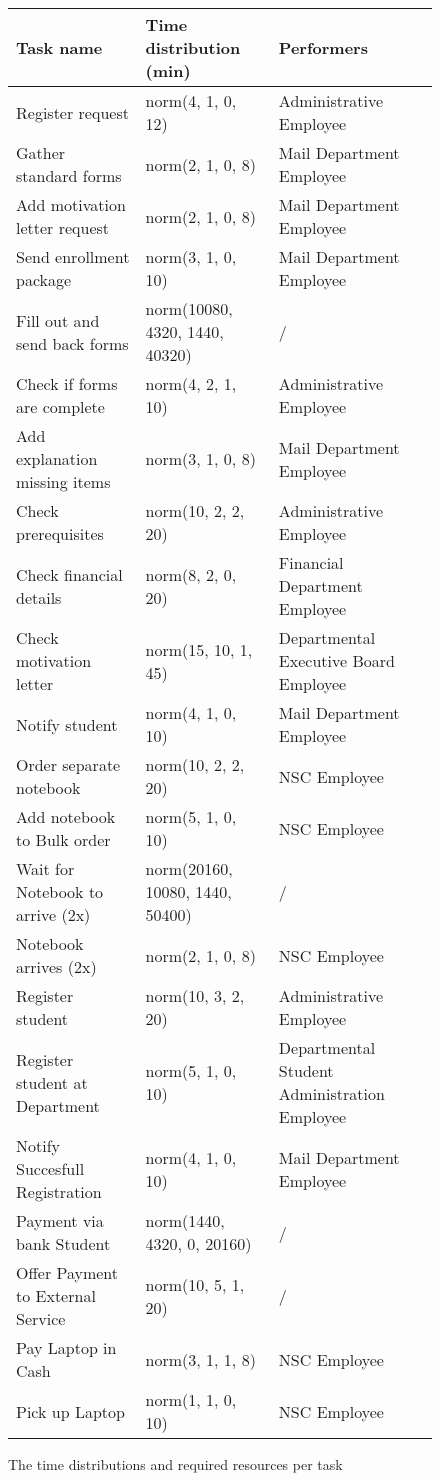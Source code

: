 \begin{figure}[h!]
	\centering
	\begin{tabularx}{\textwidth}{ | X | X | X | }
		\hline
		\textbf{Task name} & \textbf{Time distribution (min)} & \textbf{Performers}\\ \hline\hline
		Register request & norm(4, 1, 0, 12) & Administrative Employee \\ \hline
		Gather standard forms & norm(2, 1, 0, 8) & Mail Department Employee \\ \hline
		Add motivation letter request & norm(2, 1, 0, 8) & Mail Department Employee \\ \hline
		Send enrollment package & norm(3, 1, 0, 10) & Mail Department Employee \\ \hline
		Fill out and send back forms & norm(10080, 4320, 1440, 40320) & / \\ \hline
		Check if forms are complete & norm(4, 2, 1, 10) & Administrative Employee \\ \hline
		Add explanation missing items & norm(3, 1, 0, 8) & Mail Department Employee \\ \hline
		Check prerequisites & norm(10, 2, 2, 20) & Administrative Employee \\ \hline
		Check financial details & norm(8, 2, 0, 20) & Financial Department Employee \\ \hline
		Check motivation letter & norm(15, 10, 1, 45) & Departmental Executive Board Employee \\ \hline
		Notify student & norm(4, 1, 0, 10) & Mail Department Employee \\ \hline
		Order separate notebook & norm(10, 2, 2, 20) & NSC Employee \\ \hline
		Add notebook to Bulk order & norm(5, 1, 0, 10) & NSC Employee \\ \hline
		Wait for Notebook to arrive (2x) & norm(20160, 10080, 1440, 50400) & / \\ \hline
		Notebook arrives (2x) & norm(2, 1, 0, 8) & NSC Employee \\ \hline
		Register student & norm(10, 3, 2, 20) & 
		Administrative Employee \\ \hline
		Register student at Department & norm(5, 1, 0, 10) & Departmental Student Administration Employee \\ \hline
		Notify Succesfull Registration & norm(4, 1, 0, 10) & Mail Department Employee \\ \hline
		Payment via bank Student & norm(1440, 4320, 0, 20160) & / \\ \hline
		Offer Payment to External Service & norm(10, 5, 1, 20) & / \\ \hline
		Pay Laptop in Cash & norm(3, 1, 1, 8) & NSC Employee \\ \hline
		Pick up Laptop & norm(1, 1, 0, 10) & NSC Employee \\
		\hline
	\end{tabularx}
	\caption{The time distributions and required resources per task}
	\label{fig:tasktimes2}
\end{figure}
